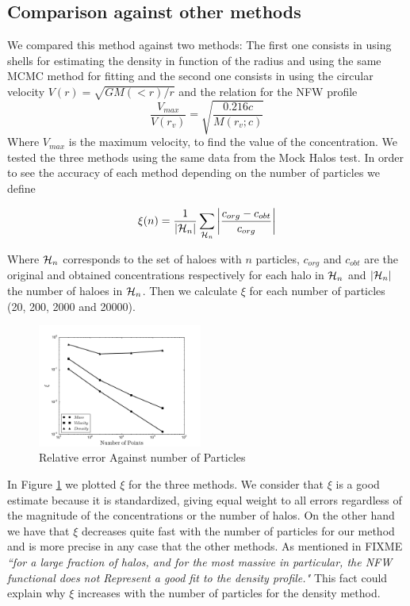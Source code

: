 \documentclass[useAMS,usenatbib]{mn2e}
\begin{document}
\subsection{Comparison against other methods}
We compared this method against two methods: The first one consists in using shells for estimating the density in function of the radius and using the same MCMC method for fitting and the second one consists in using the circular velocity $V(r)=\sqrt{GM(<r)/r}$ and the relation for the NFW profile
\begin{equation}
\frac{V_{max}}{V(r_{v})} = \sqrt{\frac{0.216c}{M(r_{v};c)}}
\end{equation}
Where $V_{max}$ is the maximum velocity, to find the value of the concentration. We tested the three methods using the same data from the Mock Halos test. In order to see the accuracy of each method depending on the number of particles we define 

\begin{equation}
\xi(n)=\frac{1}{\left|{\cal{H}}_n\right|}\sum_{{\cal{H}}_n}\left|\frac{c_{org}-c_{obt}}{c_{org}}\right|
\end{equation}

Where ${\cal{H}}_n$ corresponds to the set of haloes with $n$ particles, $c_{org}$ and $c_{obt}$ are the original and obtained concentrations respectively for each halo in ${\cal{H}}_n$ and $\left|{\cal{H}}_n\right|$ the number of haloes in ${\cal{H}}_n$. Then we calculate $\xi$ for each number of particles (20, 200, 2000 and 20000).

\begin{figure}
\begin{center}
  \includegraphics[width=0.48\textwidth]{error.pdf}
\end{center}
\caption{Relative error Against number of Particles
    \label{fig:error}}
\end{figure}

In Figure \ref{fig:error} we plotted $\xi$ for the three methods. We consider that $\xi$ is a good estimate because it is standardized, giving equal weight to all errors regardless of the magnitude of the concentrations or the number of halos. On the other hand we have that $\xi$ decreases quite fast with the number of particles for our method and is more precise in any case that the other methods. As mentioned in FIXME \textit{``for a large fraction of halos, and for the most massive in particular, the NFW functional does not Represent a good fit to the density profile."} This fact could explain why $\xi$ increases with the number of particles for the density method.
\end{document}
